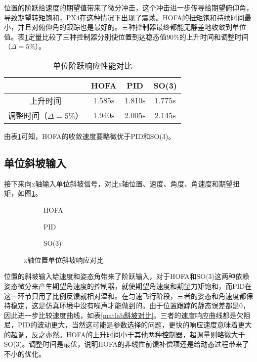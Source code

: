 位置的阶跃给速度的期望值带来了微分冲击，这个冲击进一步传导给期望俯仰角，导致期望转矩饱和，PX4在这种情况下出现了震荡。HOFA的扭矩饱和持续时间最小，并且对俯仰角的跟踪也是最好的。三种控制器最终都能无静差地收敛到单位值。表\ref{matlab阶跃对比}定量比较了三种控制器分别使位置到达稳态值$90\%$的上升时间和调整时间（$\Delta = 5\%$）。
\begin{table}[!h]
  \centering
  \caption{单位阶跃响应性能对比}
  \begin{tabular}{cccc}
      \toprule
      & HOFA & PID & SO(3) \\
      \midrule
    上升时间 & 1.585s & 1.810s & 1.775s\\
    调整时间（$\Delta = 5\%$） & 1.940s & 2.005s &2.145s \\
      \bottomrule
  \end{tabular}
  \label{matlab阶跃对比}
\end{table}
由表\ref{matlab阶跃对比}可知，HOFA的收敛速度要略微优于PID和SO(3)。

\subsection*{单位斜坡输入}

接下来向x轴输入单位斜坡信号，对比x轴位置、速度、角度、角速度和期望扭矩，如图\ref{matlab_t}。
\begin{figure}[!htp]
  \centering
  \begin{subfigure}[t]{0.49\textwidth}
    \centering
    \caption{HOFA}
  \end{subfigure}\hfill
  \begin{subfigure}[t]{0.49\textwidth}
    \centering
    \caption{PID}
  \end{subfigure}\hfill
  \begin{subfigure}[t]{0.49\textwidth}
    \centering
    \caption{SO(3)}
  \end{subfigure}
  \caption{x轴位置单位斜坡响应对比}
  \label{matlab_t}
\end{figure}

位置的斜坡输入给速度和姿态角带来了阶跃输入，对于HOFA和SO(3)这两种依赖姿态微分来产生期望角速度的控制器，就使期望角速度和期望力矩饱和，而PID在这一环节只用了比例反馈就相对温和。在匀速飞行阶段，三者的姿态和角速度都保持稳定，这是仿真环境中没有噪声才能做到的。由于位置跟踪的静态误差都是0，因此进一步比较速度曲线，如表\ref{matlab斜坡对比}。三者的速度响应曲线都是欠阻尼，PID的波动更大，当然这可能是参数选择的问题，更快的响应速度意味着更大的超调，反之亦然。HOFA的上升时间小于其他两种控制器，超调量则略微大于SO(3)。调整时间是最优，说明HOFA的非线性前馈补偿项还是给动态过程带来了不小的优化。

